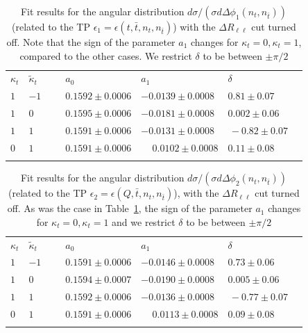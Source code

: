 \documentclass[aps,preprint,tightenlines,floatfix,superscriptaddress,nofootinbib,showpacs]{revtex4-1}
\def\tbar{\bar{t}}
\def\kp{\kappa_t}
\providecommand{\DIFadd}[1]{{\protect\color{blue}\uwave{#1}}} %
\providecommand{\DIFaddFL}[1]{\DIFadd{#1}} %
\providecommand{\DIFaddbeginFL}{} %
\providecommand{\DIFaddendFL}{} %
\begin{document}
\renewcommand{\arraystretch}{1.2}
\begin{table}[H]
\caption{Fit results for the angular distribution $d\sigma/(\sigma
  d\Delta\phi_1(n_t,n_{\tbar}))$ (related to the TP
  $\epsilon_1=\epsilon(t,\tbar,n_t,n_{\tbar})$) with the $\Delta
  R_{\ell\ell}$ cut turned off. Note that the sign of the parameter $a_1$
  changes for $\kp=0,\kp=1$, compared to the
  other cases.  We restrict $\delta$ to be between
    $\pm \pi/2$\DIFaddbeginFL \DIFaddFL{.}\DIFaddendFL }
\label{table3}
\begin{center}
\begin{tabular}{|C{1cm}|C{1cm}||C{3cm}|C{3cm}|C{3cm}|}
\hhline{|=====|}
$\kappa_t$&$\tilde{\kappa}_t$~~&$a_0$~~&$a_1$& $\delta$~~ \\ 
\hhline{|=====|} 
$1$ & $-1$~~~ & $0.1592 \pm 0.0006$ & $-0.0139 \pm 0.0008$ & $0.81 \pm 0.07$ \\[0.6mm]
\hline
$1$ & $0$ & $0.1595 \pm 0.0006$ & $-0.0181 \pm 0.0008$ & $0.002 \pm 0.06\,\,$ \\[0.6mm]
\hline
$1$ & $1$ & $0.1591 \pm 0.0006$ & $-0.0131 \pm 0.0008 $ & $\,-0.82 \pm 0.07\quad$  \\[0.6mm]
\hline
$0$ & $1$ & $0.1591 \pm 0.0006$ & ~~$\,0.0102 \pm 0.0008$ & $0.11 \pm 0.08$ \\
\hhline{|=====|}
\end{tabular}
\end{center} 
\end{table}
\begin{table}[H]
\caption{Fit results for the angular distribution $d\sigma/(\sigma
  d\Delta\phi_2(n_t,n_{\tbar}))$ (related to the TP
  $\epsilon_2=\epsilon(Q,\tbar,n_t,n_{\tbar})$), with the $\Delta
  R_{\ell\ell}$ cut turned off. As was the case in Table~\ref{table3},
  the sign of the parameter $a_1$ changes for
  $\kp=0,\kp=1$ and we restrict $\delta$ to be between
    $\pm \pi/2$\DIFaddbeginFL \DIFaddFL{.}\DIFaddendFL }
\label{table4}
\begin{center}
\begin{tabular}{|C{1cm}|C{1cm}||C{3cm}|C{3cm}|C{3cm}|}
\hhline{|=====|}
$\kappa_t$&$\tilde{\kappa}_t$~~&$a_0$~~&$a_1$& $\delta$~~ \\ 
\hhline{|=====|} 
$1$ & $-1$~~~ & $0.1591 \pm 0.0006$ & $-0.0146 \pm 0.0008$ & $0.73 \pm 0.06$ \\[0.6mm]
\hline
$1$ & $0$ & $0.1594 \pm 0.0007$ & $-0.0190 \pm 0.0008$ & $0.005 \pm 0.06\,\,$ \\[0.6mm]
\hline
$1$ & $1$ & $0.1592 \pm 0.0006$ & $-0.0136 \pm 0.0008 $ & $\,-0.77 \pm 0.07\quad$  \\[0.6mm]
\hline
$0$ & $1$ & $0.1591 \pm 0.0006$ & ~~$\,0.0113 \pm 0.0008$ & $0.09 \pm 0.08$ \\
\hhline{|=====|}
\end{tabular}
\end{center} 
\end{table}
\end{document}
